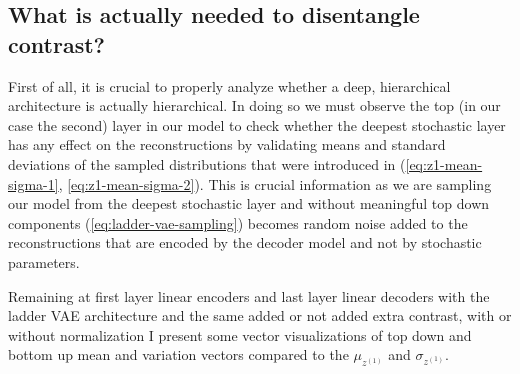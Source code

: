 \documentclass[12pt, english]{article}
\begin{document}
\newpage

\subsection{What is actually needed to disentangle contrast?}

\vspace{5mm}

\par First of all, it is crucial to properly analyze whether a deep, hierarchical architecture is actually hierarchical. In doing so we must observe the top (in our case the second) layer in our model to check whether the deepest stochastic layer has any effect on the reconstructions by validating means and standard deviations of the sampled distributions that were introduced in (\ref{eq:z1-mean-sigma-1}, \ref{eq:z1-mean-sigma-2}). This is crucial information as we are sampling our model from the deepest stochastic layer and without meaningful top down components (\ref{eq:ladder-vae-sampling}) becomes random noise added to the reconstructions that are encoded by the decoder model and not by stochastic parameters.

\vspace{4mm}

\par Remaining at first layer linear encoders and last layer linear decoders with the ladder VAE architecture and the same added or not added extra contrast, with or without normalization I present some vector visualizations of top down and bottom up mean and variation vectors compared to the $\mu_{z^{(1)}}$ and $\sigma_{z^{(1)}}$.

\vspace{4mm}
\end{document}
